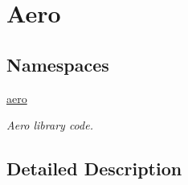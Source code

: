 \hypertarget{group__aero}{}\section{Aero}
\label{group__aero}
\subsection*{Namespaces}
\begin{DoxyCompactItemize}
\item 
 \hyperlink{namespaceaero}{aero}
\begin{DoxyCompactList}\small\item\em Aero library code. \end{DoxyCompactList}\end{DoxyCompactItemize}


\subsection{Detailed Description}
